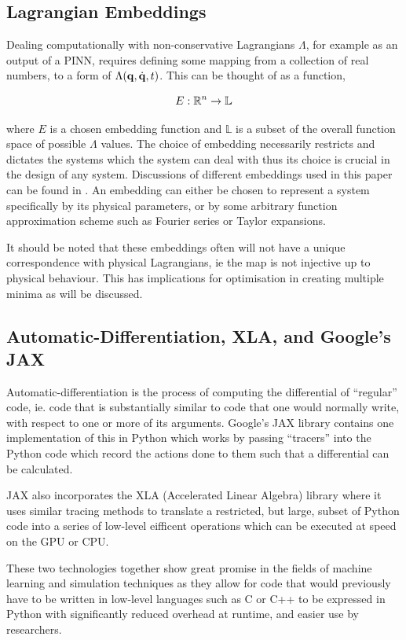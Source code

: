\subsection{Lagrangian Embeddings}

Dealing computationally with non-conservative Lagrangians $\Lambda$, for example as an output of a PINN, requires defining some mapping from a collection of real 	numbers, to a form of $\Lambda(\vb{q}, \dot{\vb{q}}, t)$. This can be thought of as a function,

\begin{equation}
  E: \mathbb{R}^n \to \mathbb{L}
\end{equation}

where $E$ is a chosen embedding function and $\mathbb{L}$ is a subset of the overall function space of possible $\Lambda$ values. The choice of embedding necessarily restricts and dictates the systems which the system can deal with thus its choice is crucial in the design of any system. Discussions of different embeddings used in this paper can be found in . An embedding can either be chosen to represent a system specifically by its physical parameters, or by some arbitrary function approximation scheme such as Fourier series or Taylor expansions.

It should be noted that these embeddings often will not have a unique correspondence with physical Lagrangians, ie the map is not injective up to physical behaviour. This has implications for optimisation in creating multiple minima as will be discussed.

\subsection{Automatic-Differentiation, XLA, and Google's JAX}
\label{sec:intro-autodiff}

Automatic-differentiation is the process of computing the differential of \enquote{regular} code, ie. code that is substantially similar to code that one would normally write, with respect to one or more of its arguments. Google's JAX library \cite{jax2018github} contains one implementation of this in Python which works by passing \enquote{tracers} into the Python code which record the actions done to them such that a differential can be calculated.

JAX also incorporates the XLA (Accelerated Linear Algebra) library \cite{openxla-xla} where it uses similar tracing methods to translate a restricted, but large, subset of Python code into a series of low-level eifficent operations which can be executed at speed on the GPU or CPU.

These two technologies together show great promise in the fields of machine learning and simulation techniques as they allow for code that would previously have to be written in low-level languages such as C or C++ to be expressed in Python with significantly reduced overhead at runtime, and easier use by researchers.
